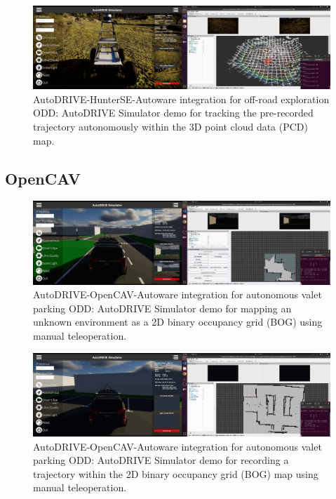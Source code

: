 \begin{figure}[H]
    \centering
    \includegraphics[width=\linewidth]{Figures/fig30.png}
    \caption{AutoDRIVE-HunterSE-Autoware integration for off-road exploration ODD: AutoDRIVE Simulator demo for tracking the pre-recorded trajectory autonomously within the 3D point cloud data (PCD) map.}
    \label{fig: figure30}
\end{figure}

\hypertarget{OpenCAV}{%
\subsection{OpenCAV}\label{OpenCAV}}

\begin{figure}[H]
    \centering
    \includegraphics[width=\linewidth]{Figures/fig31.png}
    \caption{AutoDRIVE-OpenCAV-Autoware integration for autonomous valet parking ODD: AutoDRIVE Simulator demo for mapping an unknown environment as a 2D binary occupancy grid (BOG) using manual teleoperation.}
    \label{fig: figure31}
\end{figure}

\begin{figure}[H]
    \centering
    \includegraphics[width=\linewidth]{Figures/fig32.png}
    \caption{AutoDRIVE-OpenCAV-Autoware integration for autonomous valet parking ODD: AutoDRIVE Simulator demo for recording a trajectory within the 2D binary occupancy grid (BOG) map using manual teleoperation.}
    \label{fig: figure32}
\end{figure}

